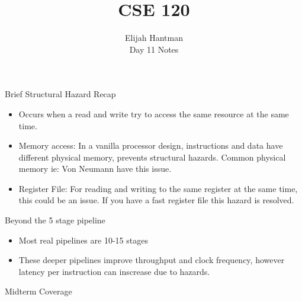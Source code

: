 \documentclass{report}
\title{\Huge{CSE 120}}
\author{\huge{Elijah Hantman}\\Day 11 Notes}
\date{}
\begin{document}
\maketitle
\newpage

\begin{description}
    \item {\large Brief Structural Hazard Recap}
        \begin{mdframed}
            \begin{itemize}
                \item Occurs when a read and write try to
                    access the same resource at the same
                    time.
                \item Memory access: In a vanilla processor
                    design, instructions and data have
                    different physical memory, prevents
                    structural hazards. Common physical
                    memory ie: Von Neumann have this issue.
                \item Register File: For reading and writing
                    to the same register at the same time,
                    this could be an issue. If you have a 
                    fast register file this hazard is resolved.
            \end{itemize}
        \end{mdframed}
    \item {\large Beyond the 5 stage pipeline} 
        \begin{mdframed}
           \begin{itemize}
               \item Most real pipelines are 10-15 stages
               \item These deeper pipelines improve throughput
                   and clock frequency, however latency per
                   instruction can inscrease due to hazards.
           \end{itemize} 
        \end{mdframed}
    \item {\large Midterm Coverage}
\end{description}
\end{document}
